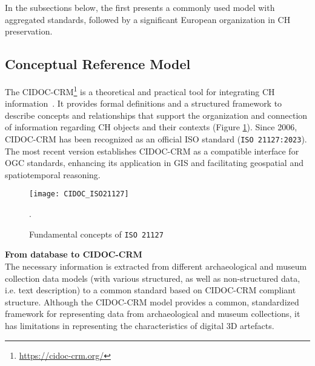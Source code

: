 In the subsections below, the first presents a commonly used model with aggregated standards, followed by a significant European organization in \gls{CH} preservation.

\subsection{ Conceptual Reference Model} 
\label{sec:cidoc}


The \gls{CIDOC-CRM}\footnote{\url{https://cidoc-crm.org/}} is a theoretical and practical tool for integrating \gls{CH} information~\cite{eide2008encoding}. It provides formal definitions and a structured framework to describe concepts and relationships that support the organization and connection of information regarding \gls{CH} objects and their contexts (Figure \ref{fig:cidoc}).
Since 2006, \gls{CIDOC-CRM} has been recognized as an official ISO standard (\texttt{ISO 21127:2023}). The most recent version establishes \gls{CIDOC-CRM} as a compatible interface for \gls{OGC} standards, enhancing its application in \gls{GIS} and facilitating geospatial and spatiotemporal reasoning.


\begin{figure}[h!]
    \centering
    \texttt{[image: CIDOC\_ISO21127]}
    \caption{Fundamental concepts of \texttt{ISO 21127}~\cite{doerr2007cidoc}}.
    \label{fig:cidoc}
\end{figure}

\noindent \textbf{From database to \gls{CIDOC-CRM}} \\
The necessary information is extracted from different archaeological and museum collection data models (with various structured, as well as non-structured
data, i.e. text description) to a common standard based on \gls{CIDOC-CRM} compliant structure.
Although the \gls{CIDOC-CRM} model provides a common, standardized framework for representing data from archaeological and museum collections, it has limitations in representing the characteristics of digital \gls{3D} artefacts.



